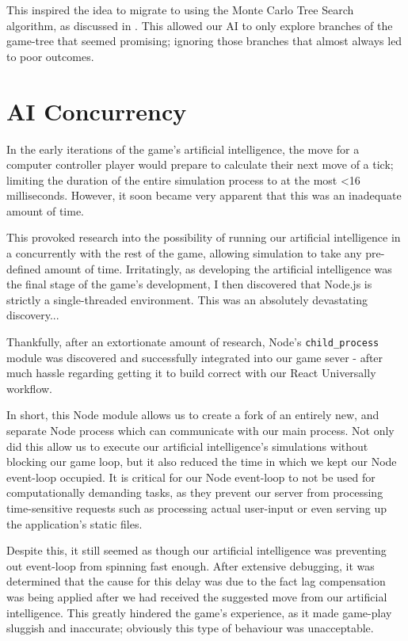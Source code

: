 \documentclass{standalone}
\begin{document}
		This inspired the idea to migrate to using the Monte Carlo Tree Search algorithm, as discussed in . This allowed our AI to only explore branches of the game-tree that seemed promising; ignoring those branches that almost always led to poor outcomes.

	\section{AI Concurrency}
		In the early iterations of the game's artificial intelligence, the move for a computer controller player would prepare to calculate their next move of a tick; limiting the duration of the entire simulation process to at the most \textless 16 milliseconds. However, it soon became very apparent that this was an inadequate amount of time.

		This provoked research into the possibility of running our artificial intelligence in a concurrently with the rest of the game, allowing simulation to take any pre-defined amount of time. Irritatingly, as developing the artificial intelligence was the final stage of the game's development, I then discovered that Node.js is strictly a single-threaded environment. This was an absolutely devastating discovery...

		Thankfully, after an extortionate amount of research, Node's \texttt{child\_process} module \parencite{nodeChildProcess} was discovered and successfully integrated into our game sever - after much hassle regarding getting it to build correct with our React Universally workflow.

		In short, this Node module allows us to create a fork of an entirely new, and separate Node process which can communicate with our main process. Not only did this allow us to execute our artificial intelligence's simulations without blocking our game loop, but it also reduced the time in which we kept our Node event-loop occupied. It is critical for our Node event-loop to not be used for computationally demanding tasks, as they prevent our server from processing time-sensitive requests such as processing actual user-input or even serving up the application's static files.

		Despite this, it still seemed as though our artificial intelligence was preventing out event-loop from spinning fast enough. After extensive debugging, it was determined that the cause for this delay was due to the fact lag compensation was being applied after we had received the suggested move from our artificial intelligence. This greatly hindered the game's experience, as it made game-play sluggish and inaccurate; obviously this type of behaviour was unacceptable.
\end{document}
